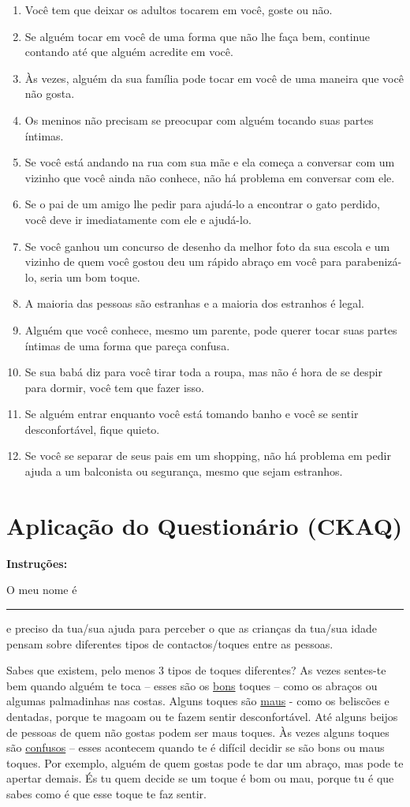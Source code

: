 \begin{enumerate}
	\item Você tem que deixar os adultos tocarem em você, goste ou não.
	\item Se alguém tocar em você de uma forma que não lhe faça bem, continue contando até que alguém acredite em você.
	\item Às vezes, alguém da sua família pode tocar em você de uma maneira que você não gosta.
	\item Os meninos não precisam se preocupar com alguém tocando suas partes íntimas.
	\item Se você está andando na rua com sua mãe e ela começa a conversar com um vizinho que você ainda não conhece, não há problema em conversar com ele.
	\item Se o pai de um amigo lhe pedir para ajudá-lo a encontrar o gato perdido, você deve ir imediatamente com ele e ajudá-lo.
	\item Se você ganhou um concurso de desenho da melhor foto da sua escola e um vizinho de quem você gostou deu um rápido abraço em você para parabenizá-lo, seria um bom toque.
	\item A maioria das pessoas são estranhas e a maioria dos estranhos é legal.
	\item Alguém que você conhece, mesmo um parente, pode querer tocar suas partes íntimas de uma forma que pareça confusa.
	\item Se sua babá diz para você tirar toda a roupa, mas não é hora de se despir para dormir, você tem que fazer isso.
	\item Se alguém entrar enquanto você está tomando banho e você se sentir desconfortável, fique quieto.
	\item Se você se separar de seus pais em um shopping, não há problema em pedir ajuda a um balconista ou segurança, mesmo que sejam estranhos.
\end{enumerate}

\chapter{Aplicação do Questionário (CKAQ)}\label{chap:teste}

\noindent
\textbf{Instruções:}

O meu nome é \rule{3.0cm}{0.15mm} e preciso da tua/sua ajuda para perceber o que as crianças da tua/sua idade pensam sobre diferentes tipos de contactos/toques entre as pessoas. 

Sabes que existem, pelo menos 3 tipos de toques diferentes? As vezes sentes-te bem quando alguém te toca – esses são os \underline{bons} toques – como os abraços ou algumas palmadinhas nas costas. Alguns toques são \underline{maus} - como os beliscões e dentadas, porque te magoam ou te fazem sentir desconfortável. Até alguns beijos de pessoas de quem não gostas podem ser maus toques. Às vezes alguns toques são \underline{confusos} – esses acontecem quando te é difícil decidir se são bons ou maus toques. Por exemplo, alguém de quem gostas pode te dar um abraço, mas pode te apertar demais. És tu quem decide se um toque é bom ou mau, porque tu é que sabes como é que esse toque te faz sentir.

